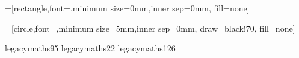 =[rectangle,font=\small,minimum size=0mm,inner sep=0mm,
                                    fill=none]

=[circle,font=\small,minimum size=5mm,inner sep=0mm,
                                   draw=black!70,
                                    fill=none]


\graphicspath{{../images/}}

\DeclareMathAccent{\dot}     {\mathalpha}{legacymaths}{95}
\DeclareMathAccent{\bar}     {\mathalpha}{legacymaths}{22}
\DeclareMathAccent{\tilde}     {\mathalpha}{legacymaths}{126}

